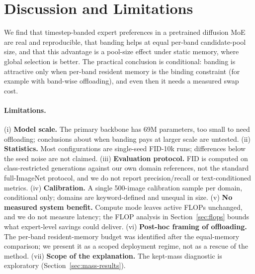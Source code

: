 \section{Discussion and Limitations}\label{sec:limits}

We find that timestep-banded expert preferences in a pretrained diffusion MoE are real and reproducible, that banding helps at equal per-band candidate-pool size, and that this advantage is a pool-size effect under static memory, where global selection is better.
The practical conclusion is conditional: banding is attractive only when per-band resident memory is the binding constraint (for example with band-wise offloading), and even then it needs a measured swap cost. 

\paragraph{Limitations.}
(i) \textbf{Model scale.} The primary backbone has 69M parameters, too small to need offloading; conclusions about when banding pays at larger scale are untested. 
(ii) \textbf{Statistics.} Most configurations are single-seed FID-10k runs; differences below the seed noise are not claimed. 
(iii) \textbf{Evaluation protocol.} FID is computed on class-restricted generations against our own domain references, not the standard full-ImageNet protocol, and we do not report precision/recall or text-conditioned metrics. 
(iv) \textbf{Calibration.} A single 500-image calibration sample per domain, conditional only; domains are keyword-defined and unequal in size.
(v) \textbf{No measured system benefit.} Compute mode leaves active FLOPs unchanged, and we do not measure latency; the FLOP analysis in Section~\ref{sec:flops} bounds what expert-level savings could deliver.
(vi) \textbf{Post-hoc framing of offloading.} The per-band resident-memory budget was identified after the equal-memory comparison; we present it as a scoped deployment regime, not as a rescue of the method.
(vii) \textbf{Scope of the explanation.} The kept-mass diagnostic is exploratory (Section~\ref{sec:mass-results}).
